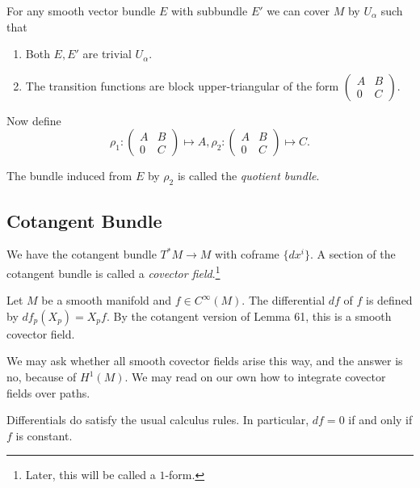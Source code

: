 \documentclass[twoside, 10pt]{article}
\begin{document}
    \begin{prop}
        For any smooth vector bundle $E$ with subbundle $E'$ we can cover $M$ by $U_{\alpha}$ such that
        \begin{enumerate}
            \item Both $E,E'$ are trivial $U_{\alpha}$.
            \item The transition functions are block upper-triangular of the form $ \begin{pmatrix}
                    A & B \\ 0 & C
            \end{pmatrix}. $
        \end{enumerate}
    \end{prop}

    Now define \[\rho_1: \begin{pmatrix}
        A & B \\ 0 & C
    \end{pmatrix} \mapsto A, \rho_2: \begin{pmatrix}
        A & B \\0 & C
    \end{pmatrix} \mapsto C.\]

    \begin{defn}
        The bundle induced from $E$ by $\rho_2$ is called the \textit{quotient bundle}.
    \end{defn}

    \subsection{Cotangent Bundle}%
    \label{sub:cotangent_bundle}
    
    We have the cotangent bundle $T^*M \to M$ with coframe $\{dx^i\}$. A section of the cotangent bundle is called a \textit{covector field}.\footnote{Later, this will be called a $1$-form.}
    
    \begin{exm}
        Let $M$ be a smooth manifold and $f \in C^{\infty}(M)$. The differential $df$ of $f$ is defined by $df_p(X_p) = X_p f$. By the cotangent version of Lemma 61, this is a smooth covector field.
    \end{exm}

    We may ask whether all smooth covector fields arise this way, and the answer is no, because of $H^1(M)$. We may read on our own how to integrate covector fields over paths.

    Differentials do satisfy the usual calculus rules. In particular, $df = 0$ if and only if $f$ is constant.
\end{document}
